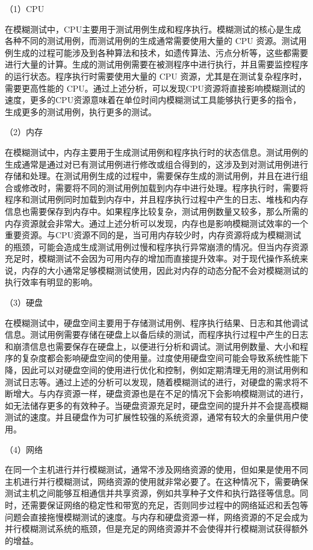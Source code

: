 \documentclass[master]{thesis-uestc}
\begin{document}
（1）CPU

在模糊测试中，CPU主要用于测试用例生成和程序执行。模糊测试的核心是生成各种不同的测试用例，而测试用例的生成通常需要使用大量的 CPU 资源。测试用例生成的过程可能涉及到各种算法和技术，如遗传算法、污点分析等，这些都需要进行大量的计算。生成的测试用例需要在被测程序中进行执行，并且需要监控程序的运行状态。程序执行时需要使用大量的 CPU 资源，尤其是在测试复杂程序时，需要更高性能的 CPU。通过上述分析，可以发现CPU资源将直接影响模糊测试的速度，更多的CPU资源意味着在单位时间内模糊测试工具能够执行更多的指令，生成更多的测试用例，执行更多的测试。

（2）内存

在模糊测试中，内存主要用于生成测试用例和程序执行时的状态信息。测试用例的生成通常是通过对已有测试用例进行修改或组合得到的，这涉及到对测试用例进行存储和处理。在测试用例生成的过程中，需要保存生成的测试用例，并且在进行组合或修改时，需要将不同的测试用例加载到内存中进行处理。程序执行时，需要将程序和测试用例同时加载到内存中，并且程序执行过程中产生的日志、堆栈和内存信息也需要保存到内存中。如果程序比较复杂，测试用例数量又较多，那么所需的内存资源就会非常大。通过上述分析可以发现，内存也是影响模糊测试效率的一个重要资源。与CPU资源不同的是，当可用内存较少时，内存资源将成为模糊测试的瓶颈，可能会造成生成测试用例过慢和程序执行异常崩溃的情况。但当内存资源充足时，模糊测试不会因为可用内存的增加而直接提升效率。对于现代操作系统来说，内存的大小通常足够模糊测试使用，因此对内存的动态分配不会对模糊测试的执行效率有明显的影响。

（3）硬盘

在模糊测试中，硬盘空间主要用于存储测试用例、程序执行结果、日志和其他调试信息。测试用例需要存储在硬盘上以备后续的测试，而程序执行过程中产生的日志和崩溃信息也需要保存在硬盘上，以便进行分析和调试。测试用例数量、大小和程序的复杂度都会影响硬盘空间的使用量。过度使用硬盘空间可能会导致系统性能下降，因此可以对硬盘空间的使用进行优化和控制，例如定期清理无用的测试用例和测试日志等。通过上述的分析可以发现，随着模糊测试的进行，对硬盘的需求将不断增大。与内存资源一样，硬盘资源也是在不足的情况下会影响模糊测试的进行，如无法储存更多的有效种子。当硬盘资源充足时，硬盘空间的提升并不会提高模糊测试的速度。并且硬盘作为可扩展性较强的系统资源，通常有较大的余量供用户使用。

（4）网络

在同一个主机进行并行模糊测试，通常不涉及网络资源的使用，但如果是使用不同主机进行并行模糊测试，网络资源的使用就非常必要了。在这种情况下，需要确保测试主机之间能够互相通信并共享资源，例如共享种子文件和执行路径等信息。同时，还需要保证网络的稳定性和带宽的充足，否则同步过程中的网络延迟和丢包等问题会直接拖慢模糊测试的速度。与内存和硬盘资源一样，网络资源的不足会成为并行模糊测试系统的瓶颈，但是充足的网络资源并不会使得并行模糊测试获得额外的增益。
\end{document}
